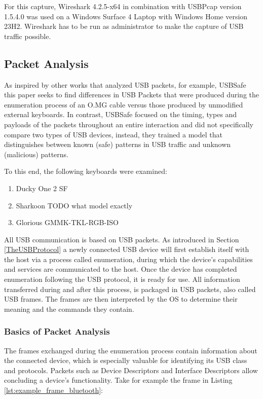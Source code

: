 For this capture, Wireshark 4.2.5-x64 in combination with USBPcap version 1.5.4.0 was used on a Windows Surface 4 Laptop with Windows Home version 23H2. Wireshark has to be run as administrator to make the capture of USB traffic possible.


\subsection{Packet Analysis}\label{Packet Analysis}


As inspired by other works that analyzed USB packets, for example, USBSafe \cite{kharrazUSBESAFEEndPointSolution2019} this paper seeks to find differences in USB Packets that were produced during the enumeration process of an O.MG cable versus those produced by unmodified external keyboards. In contrast, USBSafe focused on the timing, types and payloads of the packets throughout an entire interaction and did not specifically compare two types of USB devices, instead, they trained a model that distinguishes between known (safe) patterns in USB traffic and unknown (malicious) patterns. 

To this end, the following keyboards were examined:
\begin{enumerate}
    \item Ducky One 2 SF
    \item Sharkoon TODO what model exactly
    \item Glorious GMMK-TKL-RGB-ISO
\end{enumerate}


All USB communication is based on USB packets. As introduced in Section \ref{TheUSBProtocol} a newly connected USB device will first establish itself with the host via a process called enumeration, during which the device's capabilities and services are communicated to the host. Once the device has completed enumeration following the USB protocol, it is ready for use.
All information transferred during and after this process, is packaged in USB packets, also called USB frames. The frames are then interpreted by the OS to determine their meaning and the commands they contain.



\subsubsection{Basics of Packet Analysis}

The frames exchanged during the enumeration process contain information about the connected device, which is especially valuable for identifying its USB class and protocols.
Packets such as Device Descriptors and Interface Descriptors allow concluding a device's functionality. Take for example the frame in Listing \ref{lst:example_frame_bluetooth}:

